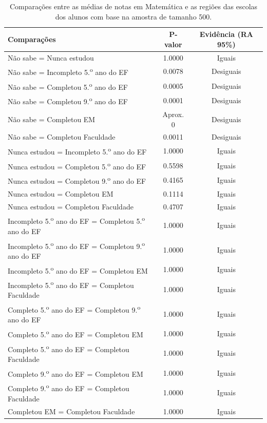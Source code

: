 \newpage
\begin{table}[htb]
    \centering
\caption{\label{comp_MT}Comparações entre as médias de notas em Matemática e as regiões das escolas dos alunos com base na amostra de tamanho 500.}
    \begin{tabular}{lcc}
    \toprule
    Comparações & P-valor & Evidência (RA 95\%)\\
    \midrule \midrule
    Não sabe = Nunca estudou & 1.0000 & Iguais\\
    Não sabe = Incompleto 5.\textsuperscript{o} ano do EF  & 0.0078 & Desiguais\\
    Não sabe = Completou 5.\textsuperscript{o} ano do EF  & 0.0005 & Desiguais\\
    Não sabe = Completou 9.\textsuperscript{o} ano do EF  & 0.0001 & Desiguais\\
    Não sabe = Completou EM & Aprox. 0 & Desiguais\\
    Não sabe = Completou Faculdade & 0.0011 & Desiguais\\
    Nunca estudou = Incompleto 5.\textsuperscript{o} ano do EF  & 1.0000 & Iguais\\
    Nunca estudou = Completou 5.\textsuperscript{o} ano do EF  & 0.5598 & Iguais\\
    Nunca estudou = Completou 9.\textsuperscript{o} ano do EF  & 0.4165 & Iguais\\
    Nunca estudou = Completou EM & 0.1114 & Iguais\\
    Nunca estudou = Completou Faculdade & 0.4707 & Iguais\\
    Incompleto 5.\textsuperscript{o} ano do EF = Completou 5.\textsuperscript{o} ano do EF  & 1.0000 & Iguais\\
    Incompleto 5.\textsuperscript{o} ano do EF = Completou 9.\textsuperscript{o} ano do EF  & 1.0000 & Iguais\\
    Incompleto 5.\textsuperscript{o} ano do EF = Completou EM & 1.0000 & Iguais\\
    Incompleto 5.\textsuperscript{o} ano do EF = Completou Faculdade & 1.0000 & Iguais\\
    Completo 5.\textsuperscript{o} ano do EF = Completou 9.\textsuperscript{o} ano do EF  & 1.0000 & Iguais\\
    Completo 5.\textsuperscript{o} ano do EF = Completou EM & 1.0000 & Iguais\\
    Completo 5.\textsuperscript{o} ano do EF = Completou Faculdade & 1.0000 & Iguais\\
    Completo 9.\textsuperscript{o} ano do EF = Completou EM & 1.0000 & Iguais\\
    Completo 9.\textsuperscript{o} ano do EF = Completou Faculdade & 1.0000 & Iguais\\
    Completou EM = Completou Faculdade & 1.0000 & Iguais\\
    \bottomrule
    \end{tabular}
    \centering
    
\end{table}
